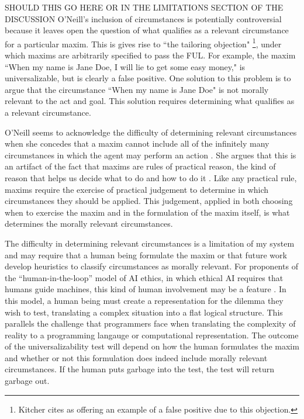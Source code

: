 \begin{isabellebody}
\begin{isamarkuptext}
\color{red} SHOULD THIS GO HERE OR IN THE LIMITATIONS SECTION OF THE DISCUSSION
O'Neill's inclusion of circumstances is potentially controversial because it leaves open the question of what qualifies as a 
relevant circumstance for a particular maxim. This is gives rise to ``the tailoring objection" \citep[217]{whatisamaxim} \footnote{Kitcher
cites \citet{kantsethicalthought} as offering an example of a false positive due to this objection.}, 
under which maxims are arbitrarily specified to pass the FUL. For example, the maxim ``When my name is Jane Doe,
I will lie to get some easy money," is universalizable, but is clearly a false positive. One solution to 
this problem is to argue that the circumstance ``When my name is Jane Doe" is not morally relevant 
to the act and goal. This solution requires determining what qualifies as a relevant circumstance.

O'Neill seems to acknowledge the difficulty of determining relevant circumstances when she concedes that a maxim cannot include all 
of the infinitely many circumstances in which the agent may perform an action \citep[4:428]{actingonprinciple}. She argues that this is 
an artifact of the fact that maxims are rules of practical reason, the kind of reason that helps us decide what to do 
and how to do it \citep{bok}. Like any practical rule, 
maxims require the exercise of practical judgement to determine in which circumstances they should be applied. 
This judgement, applied in both choosing when to exercise the maxim and in the formulation of the maxim 
itself, is what determines the morally relevant circumstances.

The difficulty in determining relevant circumstances is a limitation of my system and may require that a 
human being formulate the maxim or that future work develop heuristics to classify circumstances as morally 
relevant. For proponents of the ``human-in-the-loop'' model of AI ethics, in which ethical AI requires that 
humans guide machines, this kind of human involvement may be a feature \citep{loop}. In this model, 
a human being must create a representation for the dilemma they wish to test, translating 
a complex situation into a flat logical structure. This parallels the challenge that programmers 
face when translating the complexity of reality to a programming langauge or computational representation. 
The outcome of the universalizability test will depend on how the human formulates the maxim
and whether or not this formulation does indeed include morally relevant circumstances. If the human puts 
garbage into the test, the test will return garbage out.


\end{isamarkuptext}
\end{isabellebody}
